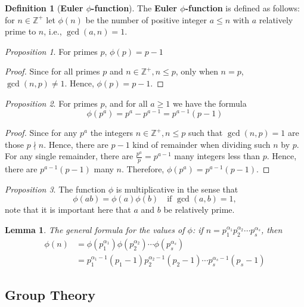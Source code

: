 \documentclass[paper=a4, fontsize=11pt]{scrartcl}
\newtheorem{lemma}[theorem]{Lemma}
\numberwithin{equation}{section}		%
\numberwithin{figure}{section}			%
\numberwithin{table}{section}				%
\theoremstyle{definition}
\newtheorem{definition}{Definition}[section]
\theoremstyle{remark}
\theoremstyle{example}
\newtheorem{prop}{Proposition}[section]
\begin{document}
\begin{definition}[\textbf{Euler $\phi$-function}]
    The \textbf{Euler $\phi$-function} is defined as follows: for $n \in \mathbb{Z}^{+}$ let $\phi(n)$ be the number of positive integer $a \leq n$ with $a$ relatively prime to $n$, i.e., $\gcd(a,n) = 1$.
\end{definition}

\begin{prop}
    For primes $p$, $\phi(p) = p - 1$
\end{prop}

\begin{proof}
    Since for all primes $p$ and $n \in \mathbb{Z}^{+}, n \leq p$, only when $n = p$, $\gcd(n,p) \neq 1$. Hence, $\phi(p) = p-1$.
\end{proof}

\begin{prop}
    For primes $p$, and for all $a \geq 1$ we have the formula
    \begin{equation}
        \phi(p^a) = p^a - p^{a-1} = p^{a-1}(p-1)
    \end{equation}
\end{prop}

\begin{proof}
    Since for any $p^a$ the integers $n \in \mathbb{Z}^{+}, n \leq p$ such that $\gcd(n,p) = 1$ are those $p \nmid n$. Hence, there are $p-1$ kind of remainder when dividing such $n$ by $p$. For any single remainder, there are $\tfrac{p^a}{p} = p^{a-1}$ many integers less than $p$. Hence, there are $p^{a-1}(p-1)$ many $n$. Therefore, $\phi(p^a) = p^{a-1}(p-1)$.
\end{proof}

\begin{prop}
    The function $\phi$ is multiplicative in the sense that
    \begin{equation}
        \phi(ab) = \phi(a)\phi(b) \quad \text{if } \gcd(a,b) = 1,
    \end{equation}
    note that it is important here that $a$ and $b$ be relatively prime.
\end{prop}

\begin{lemma}
    The general formula for the values of $\phi$: if $n = p_1^{\alpha_1}p_2^{\alpha_2}\cdots p_s^{\alpha_s}$, then 
    \begin{equation}
        \begin{aligned}
            \phi(n) &= \phi(p_1^{\alpha_1})\phi(p_2^{\alpha_2})\cdots \phi(p_s^{\alpha_s})\\
            &= p_1^{\alpha_1-1}(p_1-1)p_2^{\alpha_2-1}(p_2-1)\cdots p_s^{\alpha_s-1}(p_s-1)
        \end{aligned}
    \end{equation}
\end{lemma}

\newpage
\subsection{Group Theory}




\newpage
\printbibliography
\end{document}
